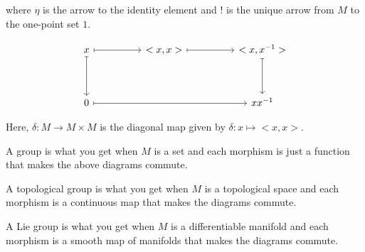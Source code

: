 \documentclass[uplatex,a4j,12pt,dvipdfmx]{jsarticle}
\begin{document}
where $\eta$ is the arrow to the identity element and $!$ is the unique arrow from $M$ to the one-point set $1$.

\[
	\begin{tikzcd}
		x \arrow[dd, maps to] \arrow[rr, maps to] &  & {<x,x>} \arrow[rr, maps to] &  & {<x,x^{-1}>} \arrow[dd, maps to] \\
		&  &                              &  &                                    \\
		0 \arrow[rrrr, maps to]                       &  &                              &  & xx^{-1}
	\end{tikzcd}
\]

Here, $\delta : M \to M \times M$ is the diagonal map given by $\delta : x \mapsto <x,x>$.

\bigskip

A group is what you get when $M$ is a set and each morphism is just a function that makes the above diagrams commute.

A topological group is what you get when $M$ is a topological space and each morphism is a continuous map that makes the diagrams commute.

A Lie group is what you get when $M$ is a differentiable manifold and each morphism is a smooth map of manifolds that makes the diagrams commute.
\end{document}
